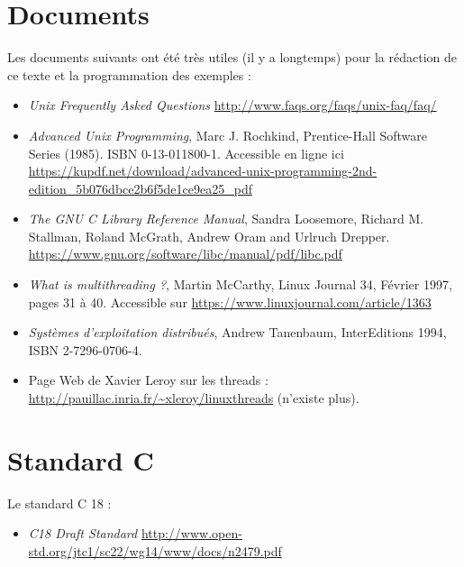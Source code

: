 
\section{Documents}
Les documents suivants ont été très utiles (il y a longtemps) pour la rédaction
de ce texte et la programmation des exemples :

\begin{itemize}
  
\item \emph{Unix Frequently Asked Questions}
  \url{http://www.faqs.org/faqs/unix-faq/faq/}

\item 
\emph{Advanced Unix Programming}, Marc J. Rochkind, Prentice-Hall Software Series
(1985).
ISBN 0-13-011800-1. Accessible en ligne ici \url{https://kupdf.net/download/advanced-unix-programming-2nd-edition_5b076dbce2b6f5de1ce9ea25_pdf}

\item \emph{The GNU C Library Reference Manual}, Sandra Loosemore,
  Richard M. Stallman, Roland McGrath, Andrew Oram and Urlruch Drepper.
  \url{https://www.gnu.org/software/libc/manual/pdf/libc.pdf}
  
\item 
\emph{What is multithreading ?}, Martin McCarthy, Linux Journal 34, 
Février 1997, pages 31 à 40. Accessible sur \url{https://www.linuxjournal.com/article/1363}

\item \emph{Systèmes d'exploitation distribués}, Andrew Tanenbaum,
InterEditions 1994, ISBN 2-7296-0706-4. 

\item  
Page Web de Xavier Leroy sur les threads :
\url{http://pauillac.inria.fr/~xleroy/linuxthreads} (n'existe plus).
\end{itemize}

\section{Standard C}

Le standard C 18 :

\begin{itemize}
  \item \emph{C18 Draft Standard} \url{http://www.open-std.org/jtc1/sc22/wg14/www/docs/n2479.pdf}
\end{itemize}
